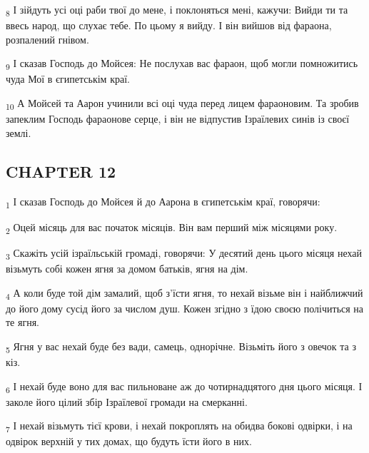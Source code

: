 \begin{tcolorbox}
\textsubscript{8} І зійдуть усі оці раби твої до мене, і поклоняться мені, кажучи: Вийди ти та ввесь народ, що слухає тебе. По цьому я вийду. І він вийшов від фараона, розпалений гнівом.
\end{tcolorbox}
\begin{tcolorbox}
\textsubscript{9} І сказав Господь до Мойсея: Не послухав вас фараон, щоб могли помножитись чуда Мої в єгипетськім краї.
\end{tcolorbox}
\begin{tcolorbox}
\textsubscript{10} А Мойсей та Аарон учинили всі оці чуда перед лицем фараоновим. Та зробив запеклим Господь фараонове серце, і він не відпустив Ізраїлевих синів із своєї землі.
\end{tcolorbox}
\subsection{CHAPTER 12}
\begin{tcolorbox}
\textsubscript{1} І сказав Господь до Мойсея й до Аарона в єгипетськім краї, говорячи:
\end{tcolorbox}
\begin{tcolorbox}
\textsubscript{2} Оцей місяць для вас початок місяців. Він вам перший між місяцями року.
\end{tcolorbox}
\begin{tcolorbox}
\textsubscript{3} Скажіть усій ізраїльській громаді, говорячи: У десятий день цього місяця нехай візьмуть собі кожен ягня за домом батьків, ягня на дім.
\end{tcolorbox}
\begin{tcolorbox}
\textsubscript{4} А коли буде той дім замалий, щоб з'їсти ягня, то нехай візьме він і найближчий до його дому сусід його за числом душ. Кожен згідно з їдою своєю полічиться на те ягня.
\end{tcolorbox}
\begin{tcolorbox}
\textsubscript{5} Ягня у вас нехай буде без вади, самець, однорічне. Візьміть його з овечок та з кіз.
\end{tcolorbox}
\begin{tcolorbox}
\textsubscript{6} І нехай буде воно для вас пильноване аж до чотирнадцятого дня цього місяця. І заколе його цілий збір Ізраїлевої громади на смерканні.
\end{tcolorbox}
\begin{tcolorbox}
\textsubscript{7} І нехай візьмуть тієї крови, і нехай покроплять на обидва бокові одвірки, і на одвірок верхній у тих домах, що будуть їсти його в них.
\end{tcolorbox}
